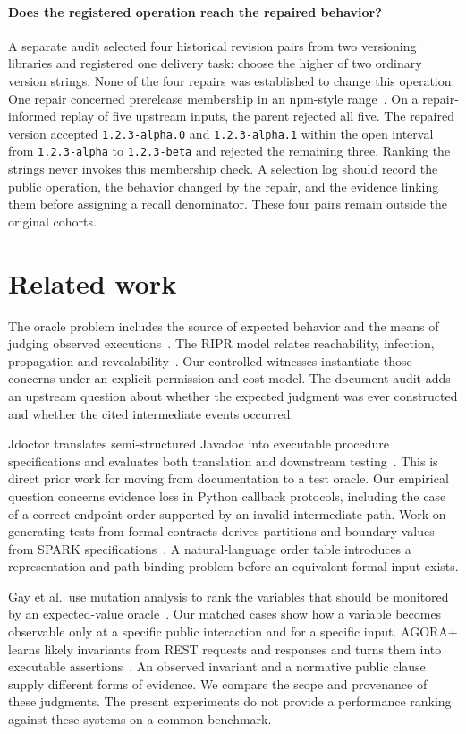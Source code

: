 \documentclass[conference]{IEEEtran}
\begin{document}
\paragraph{Does the registered operation reach the repaired behavior?}
A separate audit selected four historical revision pairs from two versioning libraries and registered one delivery task: choose the higher of two ordinary version strings. None of the four repairs was established to change this operation. One repair concerned prerelease membership in an npm-style range~\cite{npmrange}. On a repair-informed replay of five upstream inputs, the parent rejected all five. The repaired version accepted \texttt{1.2.3-alpha.0} and \texttt{1.2.3-alpha.1} within the open interval from \texttt{1.2.3-alpha} to \texttt{1.2.3-beta} and rejected the remaining three. Ranking the strings never invokes this membership check. A selection log should record the public operation, the behavior changed by the repair, and the evidence linking them before assigning a recall denominator. These four pairs remain outside the original cohorts.

\section{Related work}
The oracle problem includes the source of expected behavior and the means of judging observed executions~\cite{barr}. The RIPR model relates reachability, infection, propagation and revealability~\cite{ripr}. Our controlled witnesses instantiate those concerns under an explicit permission and cost model. The document audit adds an upstream question about whether the expected judgment was ever constructed and whether the cited intermediate events occurred.

Jdoctor translates semi-structured Javadoc into executable procedure specifications and evaluates both translation and downstream testing~\cite{jdoctor}. This is direct prior work for moving from documentation to a test oracle. Our empirical question concerns evidence loss in Python callback protocols, including the case of a correct endpoint order supported by an invalid intermediate path. Work on generating tests from formal contracts derives partitions and boundary values from SPARK specifications~\cite{formal}. A natural-language order table introduces a representation and path-binding problem before an equivalent formal input exists.

Gay et al.\ use mutation analysis to rank the variables that should be monitored by an expected-value oracle~\cite{oracledata}. Our matched cases show how a variable becomes observable only at a specific public interaction and for a specific input. AGORA+ learns likely invariants from REST requests and responses and turns them into executable assertions~\cite{agora}. An observed invariant and a normative public clause supply different forms of evidence. We compare the scope and provenance of these judgments. The present experiments do not provide a performance ranking against these systems on a common benchmark.
\end{document}

